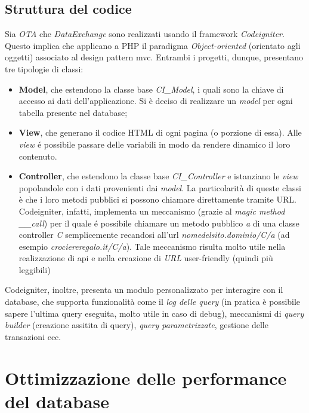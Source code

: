 \subsection{Struttura del codice}
Sia \textit{OTA} che \textit{DataExchange} sono realizzati usando il framework \textit{Codeigniter}. Questo implica che applicano a PHP il paradigma \textit{Object-oriented} (orientato agli oggetti) associato al design pattern \gls{mvc}. Entrambi i progetti, dunque, presentano tre tipologie di classi:
\begin{itemize}
	\item \textbf{Model}, che estendono la classe base \textit{CI\_Model}, i quali sono la chiave di accesso ai dati dell'applicazione. Si è deciso di realizzare un \textit{model} per ogni tabella presente nel database;
	\item \textbf{View}, che generano il codice HTML di ogni pagina (o porzione di essa). Alle \textit{view} é possibile passare delle variabili in modo da rendere dinamico il loro contenuto.
	\item \textbf{Controller}, che estendono la classe base \textit{CI\_Controller} e istanziano le \textit{view} popolandole con i dati provenienti dai \textit{model}. La particolarità di queste classi è che i loro metodi pubblici si possono chiamare direttamente tramite URL. Codeigniter, infatti, implementa un meccanismo (grazie al \textit{magic method \_\_call}) per il quale é possibile chiamare un metodo pubblico \textit{a} di una classe controller \textit{C} semplicemente recandosi all'url \textit{nomedelsito.dominio/C/a} (ad esempio \textit{crociereregalo.it/C/a}). Tale meccanismo risulta molto utile nella realizzazione di \gls{api} e nella creazione di \textit{URL} user-friendly (quindi più leggibili)
\end{itemize} 
Codeigniter, inoltre, presenta un modulo personalizzato per interagire con il database, che supporta funzionalità come il \textit{log delle query} (in pratica è possibile sapere l'ultima query eseguita, molto utile in caso di debug), meccanismi di \textit{query builder} (creazione assitita di query), \textit{query parametrizzate}, gestione delle transazioni ecc.

\section{Ottimizzazione delle performance del database}
